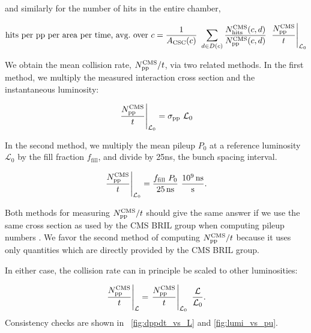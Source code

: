 and similarly for the number of hits in the entire chamber,

\begin{equation}
    \label{eqn:hits_perA_perT_perCSC}
\text{hits per \pp per area per time, avg.\ over $c$} =   
  \frac{1}{A_\text{CSC}(c)}  \  \sum_{d\in D(c)}{\frac{N_\text{hits}^\text{CMS}(c,d)}{N_\text{\pp}^\text{CMS}(c,d)}} \  \left.\frac{N_\text{\pp}^\text{CMS}}{t}\right|_{\mathcal{L}_0}
\end{equation}

We obtain the mean \pp collision rate, $N_\text{\ensuremath{\mathrm{p}}\ensuremath{\mathrm{p}}}^\text{CMS}/t$,
via two related methods. In the first method, we multiply the 
measured \pp interaction cross section and the
instantaneous luminosity:

\begin{equation}
    \label{eqn:sigmaPP_x_lumi}
    \left.\frac{N_\text{\ensuremath{\mathrm{p}}\ensuremath{\mathrm{p}}}^\text{CMS}}{t}\right|_{\mathcal{L}_0} = \sigma_\text{\ensuremath{\mathrm{p}}\ensuremath{\mathrm{p}}}  \  \mathcal{L}_0
\end{equation}

In  the second method, we multiply the mean pileup $P_0$ at a reference luminosity $\mathcal{L}_0$ by the fill fraction $f_\text{fill}$, and divide by 25\unit{ns}, the bunch spacing interval. 

\begin{equation}
    \label{eqn:PU_x_ff_over_BS}
	\left.\frac{N_\text{\ensuremath{\mathrm{p}}\ensuremath{\mathrm{p}}}^\text{CMS}}{t}\right|_{\mathcal{L}_0} = \frac{f_\text{fill}  \  P_0}{25\text{\,ns}}  \  \frac{10^9\text{\,ns}}{\text{s}}.
\end{equation}

Both methods for measuring $N_\text{\ensuremath{\mathrm{p}}\ensuremath{\mathrm{p}}}^\text{CMS}/t$ should give the same answer if we use the same cross section
as used by the CMS BRIL group when computing pileup numbers \cite{Sirunyan:2018nqx,PileupTwiki}.
We favor the second method of computing $N_\text{\ensuremath{\mathrm{p}}\ensuremath{\mathrm{p}}}^\text{CMS}/t$ because it uses only quantities which are directly provided by the CMS BRIL group. 

In either case, the \pp collision rate can in principle be scaled to other luminosities:

\begin{equation}
    \label{eqn:PU_x_ff_over_BS_scale}
	\left.\frac{N_\text{\ensuremath{\mathrm{p}}\ensuremath{\mathrm{p}}}^\text{CMS}}{t}\right|_{\mathcal{L}} = 
	\left.\frac{N_\text{\ensuremath{\mathrm{p}}\ensuremath{\mathrm{p}}}^\text{CMS}}{t}\right|_{\mathcal{L}_0}  \  \frac{\mathcal{L}}{\mathcal{L}_0}.
\end{equation}
Consistency checks are shown in \FigsDot~\ref{fig:dppdt_vs_L} and \ref{fig:lumi_vs_pu}.

